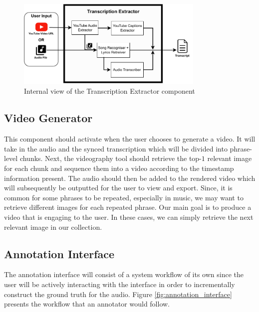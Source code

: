 \documentclass{l4proj}
\begin{document}
\begin{figure}
    \centering
    \includegraphics[width=0.8\textwidth]{figures/transcription_extractor.pdf}
    \caption{Internal view of the Transcription Extractor component}
    \label{fig:transcription_extractor}
\end{figure}

\subsection{Video Generator}
This component should activate when the user chooses to generate a video. It will take in the audio and the synced transcription which will be divided into phrase-level chunks. Next, the videography tool should retrieve the top-$1$ relevant image for each chunk and sequence them into a video according to the timestamp information present. The audio should then be added to the rendered video which will subsequently be outputted for the user to view and export. Since, it is common for some phrases to be repeated, especially in music, we may want to retrieve different images for each repeated phrase. Our main goal is to produce a video that is engaging to the user. In these cases, we can simply retrieve the next relevant image in our collection.

\subsection{Annotation Interface}
The annotation interface will consist of a system workflow of its own since the user will be actively interacting with the interface in order to incrementally construct the ground truth for the audio. Figure \ref{fig:annotation_interface} presents the workflow that an annotator would follow.
\end{document}
